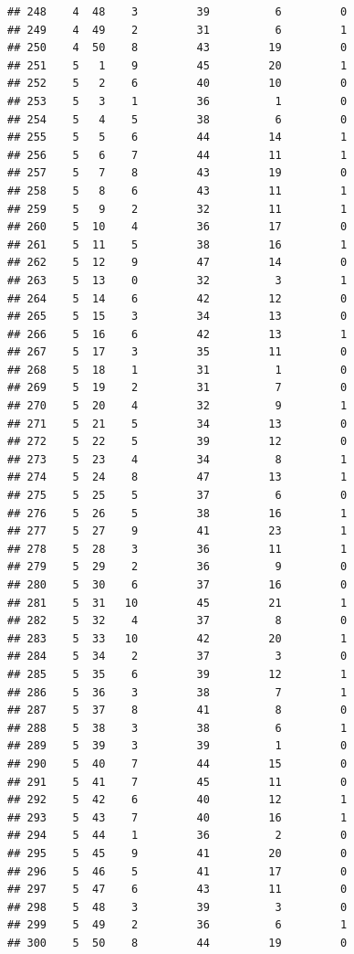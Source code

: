 \documentclass[]{book}
\begin{document}
\begin{verbatim}
## 248    4  48    3         39          6         0
## 249    4  49    2         31          6         1
## 250    4  50    8         43         19         0
## 251    5   1    9         45         20         1
## 252    5   2    6         40         10         0
## 253    5   3    1         36          1         0
## 254    5   4    5         38          6         0
## 255    5   5    6         44         14         1
## 256    5   6    7         44         11         1
## 257    5   7    8         43         19         0
## 258    5   8    6         43         11         1
## 259    5   9    2         32         11         1
## 260    5  10    4         36         17         0
## 261    5  11    5         38         16         1
## 262    5  12    9         47         14         0
## 263    5  13    0         32          3         1
## 264    5  14    6         42         12         0
## 265    5  15    3         34         13         0
## 266    5  16    6         42         13         1
## 267    5  17    3         35         11         0
## 268    5  18    1         31          1         0
## 269    5  19    2         31          7         0
## 270    5  20    4         32          9         1
## 271    5  21    5         34         13         0
## 272    5  22    5         39         12         0
## 273    5  23    4         34          8         1
## 274    5  24    8         47         13         1
## 275    5  25    5         37          6         0
## 276    5  26    5         38         16         1
## 277    5  27    9         41         23         1
## 278    5  28    3         36         11         1
## 279    5  29    2         36          9         0
## 280    5  30    6         37         16         0
## 281    5  31   10         45         21         1
## 282    5  32    4         37          8         0
## 283    5  33   10         42         20         1
## 284    5  34    2         37          3         0
## 285    5  35    6         39         12         1
## 286    5  36    3         38          7         1
## 287    5  37    8         41          8         0
## 288    5  38    3         38          6         1
## 289    5  39    3         39          1         0
## 290    5  40    7         44         15         0
## 291    5  41    7         45         11         0
## 292    5  42    6         40         12         1
## 293    5  43    7         40         16         1
## 294    5  44    1         36          2         0
## 295    5  45    9         41         20         0
## 296    5  46    5         41         17         0
## 297    5  47    6         43         11         0
## 298    5  48    3         39          3         0
## 299    5  49    2         36          6         1
## 300    5  50    8         44         19         0
\end{verbatim}
\end{document}
